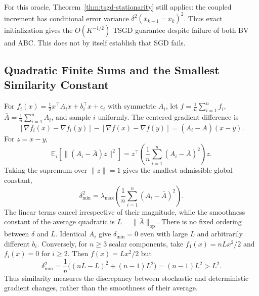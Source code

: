 For this oracle, Theorem~\ref{thm:tsgd-stationarity} still applies:
the coupled increment has conditional error variance
$\delta^2(x_{k+1}-x_k)^2$. Thus exact initialization gives the
$O(K^{-1/2})$ TSGD guarantee despite failure of both BV and ABC.
This does not by itself establish that SGD fails.

\subsection{Quadratic Finite Sums and the Smallest Similarity Constant}
\label{app:quadratic-similarity}

For $f_i(x)=\tfrac12x^\top A_ix+b_i^\top x+c_i$ with symmetric
$A_i$, let $f=\frac1n\sum_{i=1}^n f_i$,
$\bar A=\frac1n\sum_{i=1}^n A_i$, and sample $i$ uniformly.
The centered gradient difference is
\begin{equation}
\label{eq:quadratic-difference-noise}
[\nabla f_i(x)-\nabla f_i(y)]-[\nabla f(x)-\nabla f(y)]
=(A_i-\bar A)(x-y).
\end{equation}
For $z=x-y$,
\[
\mathbb E_i[\|(A_i-\bar A)z\|^2]
 =z^\top\!\left(\frac1n\sum_{i=1}^n(A_i-\bar A)^2\right)z.
\]
Taking the supremum over $\|z\|=1$ gives the smallest admissible
global constant,
\begin{equation}
\label{eq:quadratic-optimal-similarity}
\delta_{\min}^2
 =\lambda_{\max}\!\left(\frac1n\sum_{i=1}^n(A_i-\bar A)^2\right).
\end{equation}
The linear terms cancel irrespective of their magnitude, while the
smoothness constant of the average quadratic is
$L=\|\bar A\|_{\mathrm{op}}$. There is no fixed ordering between
$\delta$ and $L$. Identical $A_i$ give $\delta_{\min}=0$ even with
large $L$ and arbitrarily different $b_i$. Conversely, for $n\geq3$
scalar components, take $f_1(x)=nLx^2/2$ and $f_i(x)=0$ for $i\geq2$.
Then $f(x)=Lx^2/2$ but
\[
\delta_{\min}^2
 =\frac1n\bigl((nL-L)^2+(n-1)L^2\bigr)
 =(n-1)L^2>L^2.
\]
Thus similarity measures the discrepancy between stochastic and
deterministic gradient changes, rather than the smoothness of their
average.
